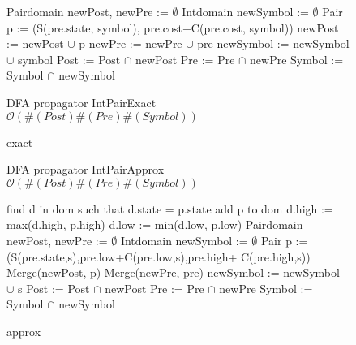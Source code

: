 \begin{figure}[H]
\begin{algorithm}[H]
\begin{algorithmic}[1]
\State Pairdomain newPost, newPre := $\emptyset$
\State Intdomain newSymbol := $\emptyset$
		\State Pair p := (S(pre.state, symbol), pre.cost+C(pre.cost, symbol))
			\State newPost := newPost $\cup$ p
			\State newPre := newPre $\cup$ pre
			\State newSymbol := newSymbol $\cup$ symbol 
		\EndIf
	\EndFor
\EndFor
\State Post := Post $\cap$ newPost
\State Pre := Pre $\cap$ newPre
\State Symbol := Symbol $\cap$ newSymbol
\EndProcedure
\end{algorithmic}
\caption{DFA propagator IntPairExact \newline $\mathcal{O}(\#(Post)\#(Pre)\#(Symbol))$}
\end{algorithm}
\caption{exact}\label{fig:algexact}
\end{figure}
\begin{figure}[H]
\begin{algorithm}[H]
\caption{DFA propagator IntPairApprox\newline $\mathcal{O}(\#(Post)\#(Pre)\#(Symbol))$}
\begin{algorithmic}[1]
	\State find d in dom such that d.state = p.state
		\State add p to dom
	\Else	
		\State d.high := max(d.high, p.high)
		\State d.low := min(d.low, p.low)
	\EndIf
\EndProcedure
{}
\State Pairdomain newPost, newPre := $\emptyset$
\State Intdomain newSymbol := $\emptyset$
		\State Pair p :=(S(pre.state,s),pre.low+C(pre.low,s),pre.high+ C(pre.high,s))
			\State Merge(newPost, p)
			\State Merge(newPre, pre)
			\State newSymbol := newSymbol $\cup$ s
		\EndIf
	\EndFor
\EndFor
\State Post := Post $\cap$ newPost
\State Pre := Pre $\cap$ newPre
\State Symbol := Symbol $\cap$ newSymbol
\EndProcedure
\end{algorithmic}
\end{algorithm}
\caption{approx}\label{fig:algapprox}
\end{figure}